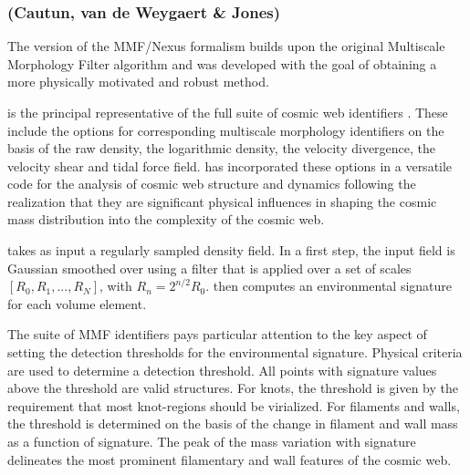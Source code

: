 \subsubsection{\nexus{} \\ \hskip 0.9cm (Cautun, van de Weygaert \& Jones)}
\label{section:nexus}
The \nexus{} version of the MMF/Nexus formalism \citep{cautun2013,cautun2014} builds upon 
the original Multiscale Morphology Filter \citep{aragon2007,aragon2010b} algorithm and was developed with the goal of obtaining 
a more physically motivated and robust method. 

\nexus{} is the principal representative of the full \Nexus{} suite of cosmic web identifiers \citep[see][]{cautun2013}. 
These include the options for corresponding multiscale morphology identifiers on the basis of the raw density, the 
logarithmic density, the velocity divergence, the velocity shear and tidal force field. \Nexus{} has incorporated these 
options in a versatile code for the analysis of cosmic web structure and dynamics following the realization that they 
are significant physical influences in shaping the cosmic mass distribution into the complexity of the cosmic web. 

\nexus{} takes as input a regularly sampled density field. In a first step, the input field is Gaussian smoothed 
over using a \logFilter{} filter \citep[see][]{cautun2013} that is applied over a set of scales $[R_0,R_1,...,R_N]$, 
with $R_n=2^{n/2}R_0$. 
\nexus{} then computes an environmental signature for 
each volume element. 

The \Nexus{} suite of MMF identifiers pays particular attention to the key aspect of setting the detection 
thresholds for the environmental signature. Physical criteria are used to determine a detection threshold. All points 
with signature values above the threshold are valid structures. For knots, the threshold is given by the requirement 
that most knot-regions should be virialized. For filaments and walls, the threshold is determined on the basis of the 
change in filament and wall mass as a function of signature. The peak of the mass variation with signature delineates 
the most prominent filamentary and wall features of the cosmic web.

